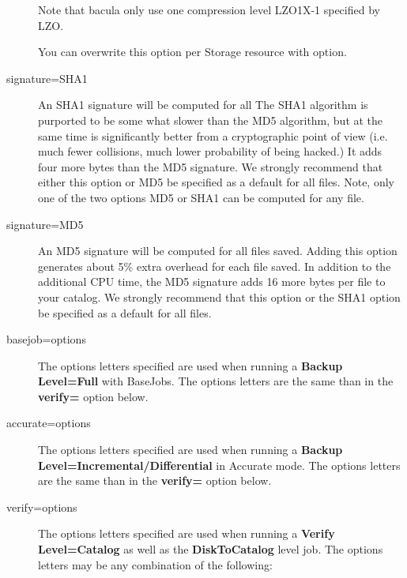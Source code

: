 \begin{description}
   Note that bacula only use one compression level LZO1X-1 specified by LZO.

   You can overwrite this option per Storage resource with
    option.

\item [signature=SHA1]
   An SHA1 signature will be computed for all The SHA1 algorithm is
   purported to be some what slower than the MD5 algorithm, but at the same
   time is significantly better from a cryptographic point of view (i.e.
   much fewer collisions, much lower probability of being hacked.) It adds
   four more bytes than the MD5 signature.  We strongly recommend that
   either this option or MD5 be specified as a default for all files.
   Note, only one of the two options MD5 or SHA1 can be computed for any
   file.

\item [signature=MD5]
   An MD5 signature will be computed for all files saved.  Adding this
   option generates about 5\% extra overhead for each file saved.  In
   addition to the additional CPU time, the MD5 signature adds 16 more
   bytes per file to your catalog.  We strongly recommend that this option
   or the SHA1 option be specified as a default for all files.


\item[basejob=\lt{}options\gt{}] 

The options letters specified are used when running a {\bf Backup Level=Full}
with BaseJobs. The options letters are the same than in the \textbf{verify=}
option below.

\item[accurate=\lt{}options\gt{}] 
   The options letters specified are used when
  running a {\bf Backup Level=Incremental/Differential} in Accurate mode. The
  options letters are the same than in the \textbf{verify=} option below. 

\item [verify=\lt{}options\gt{}]
   The options letters specified are used  when running a {\bf Verify
   Level=Catalog} as well as the  {\bf DiskToCatalog} level job. The options
   letters may be any  combination of the following:  


\end{description}

